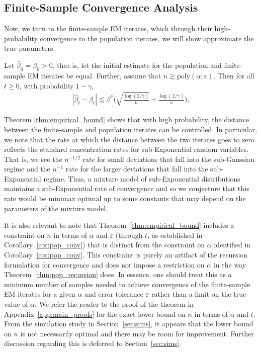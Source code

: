\documentclass[runningheads]{llncs}
\begin{document}
\subsection{Finite-Sample Convergence Analysis}
\label{sec:finite-results}
Now, we turn to the finite-sample EM iterates, which through their high-probability convergence
to the population iterates, we will show approximate the true parameters.
\begin{theorem}
  \label{thm:empirical_bound}
  Let $\hat{\beta}_0 = \beta_0 > 0$, that is, let the initial estimate for the
  population and finite-sample EM iterates be equal.
  Further, assume that $n \gtrsim \text{poly}(\alpha; \varepsilon)$.
  Then for all $t\geq0$, with probability $1-\gamma$,
  \begin{align*}
    |\hat{\beta}_{t} -\beta_{t}|
    \lesssim
    \beta^* \Big(\sqrt{\frac{\log(2/ \gamma)}{n}}
    + \frac{\log(2/ \gamma)}{n}\Big).
  \end{align*}
\end{theorem}
Theorem \ref{thm:empirical_bound} shows that with high probability, the
distance between the finite-sample and population iterates can be controlled. In
particular, we note that the rate at which the distance between the two iterates
goes to zero reflects the standard concentration rates for sub-Exponential
random variables. That is, we see the $n^{-1/2}$ rate for small deviations that
fall into the sub-Gaussian regime and the $n^{-1}$ rate for the larger
deviations that fall into the sub-Exponential regime. Thus, a mixture model of
sub-Exponential distributions maintains a sub-Exponential rate of convergence
and so we conjecture that this rate would be minimax optimal up to some
constants that may depend on the parameters of the mixture model.

It is also relevant to note that Theorem~\ref{thm:empirical_bound} includes a
constraint on $n$ in terms of $\alpha$ and $\varepsilon$ (through $t$, as
established in Corollary~\ref{cor:pop_conv}) that is distinct from the
constraint on $\alpha$ identified in Corollary~\ref{cor:pop_conv}. This
constraint is purely an artifact of the recursion formulation for convergence
and does not impose a restriction on $\alpha$ in the way
Theorem~\ref{thm:pop_recursion} does. In essence, one should treat this as a minimum
number of samples needed to achieve convergence of the finite-sample EM iterates
for a given $\alpha$ and error tolerance $\varepsilon$ rather than a limit on
the true value of $\alpha$. We refer the reader to the proof of the theorem in
Appendix~\ref{app:main_proofs} for the exact lower bound on $n$ in terms of
$\alpha$ and $t$. From the simulation study in Section~\ref{sec:sims}, it
appears that the lower bound on $n$ is not necessarily optimal and there may be
room for improvement. Further discussion regarding this is deferred to
Section~\ref{sec:sims}.
\end{document}

